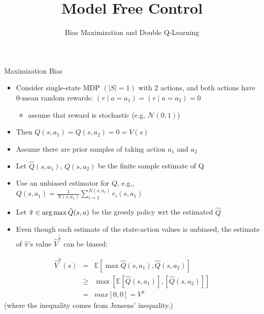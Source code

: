 


\title[Reinforcement Learning: Model Free Control]{Model Free Control}
\subtitle{Bias Maximization and Double Q-Learning}




	
	\maketitle

\begin{frame}[c]{Maximization Bias}
	
	\begin{itemize}
		\item Consider single-state MDP $(|S| = 1)$ with $2$ actions, and both actions have 0-mean random rewards: $(r \mid a = a_1 ) = (r \mid a = a_2) = 0$
		\begin{itemize}
				\item assume that reward is stochastic (e.g, $\mathcal{N}(0,1)$)
		\end{itemize}
		\item Then $Q(s,a_1) = Q(s,a_2) = 0 = V(s)$
		\item Assume there are prior samples of taking action $a_1$ and $a_2$
		\item Let $\hat{Q}(s,a_1)$, $Q(s,a_2)$ be the \alert{finite} sample estimate of Q
		\item Use an unbiased estimator for $Q$, e.g., $Q(s,a_1) = \frac{1}{N(s,a_1)} \sum_{i=1}^{N(s,a_1)} r_i(s,a_1)$
		\item Let $\hat{\pi}\in \operatorname*{arg\,max}\hat{Q}(s,a)$ be the greedy policy wrt the estimated $\hat{Q}$
		\item Even though each estimate of the state-action values is unbiased, the estimate of $\hat{\pi}$'s value $\hat{V}^{\hat{\hat{\pi}}}$ can be biased:
	\end{itemize}

\vspace{-1em}
\begin{eqnarray}
\hat{V}^{\hat{\pi}}(s) &=& \mathbb{E} [\max \hat{Q}(s,a_1), \hat{Q}(s,a_2)]\nonumber\\
&\geq& \max [\mathbb{E}[\hat{Q}(s,a_1)],[\hat{Q}(s,a_2)]]\nonumber\\
&=& max[0,0] = V^\pi\nonumber
\end{eqnarray}
(where the inequality comes from Jensens' inequality.)
	
\end{frame}
